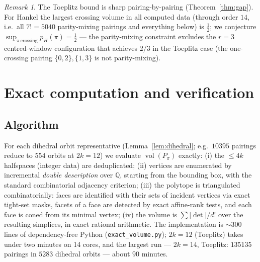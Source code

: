 ﻿\documentclass[11pt]{article}
\theoremstyle{remark}
\newtheorem{remark}[theorem]{Remark}
\newcommand{\vol}{\operatorname{vol}}
\begin{document}
\begin{remark}\label{rem:hankel-half}
The Toeplitz bound is sharp pairing-by-pairing (Theorem~\ref{thm:gap}). For Hankel the
largest crossing volume in all computed data (through order $14$, i.e.\ all
$7!=5040$ parity-mixing pairings and everything below) is $\tfrac12$; we conjecture
$\sup_{\pi\ \mathrm{crossing}}p_H(\pi)=\tfrac12$ --- the parity-mixing constraint
excludes the $r=3$ centred-window configuration that achieves $2/3$ in the Toeplitz
case (the one-crossing pairing $\{0,2\},\{1,3\}$ is not parity-mixing).
\end{remark}

\section{Exact computation and verification}\label{sec:computation}

\subsection{Algorithm}
For each dihedral orbit representative (Lemma~\ref{lem:dihedral}; e.g.\ $10395$
pairings reduce to $554$ orbits at $2k=12$) we evaluate $\vol(P_\pi)$ exactly:
(i) the $\le4k$ halfspaces (integer data) are deduplicated;
(ii) vertices are enumerated by incremental \emph{double description} over
$\mathbb{Q}$, starting from the bounding box, with the standard combinatorial
adjacency criterion;
(iii) the polytope is triangulated combinatorially: faces are identified with their
sets of incident vertices via exact tight-set masks, facets of a face are detected by
exact affine-rank tests, and each face is coned from its minimal vertex;
(iv) the volume is $\sum|\det|/d!$ over the resulting simplices, in exact rational
arithmetic. The implementation is $\sim$300 lines of dependency-free Python
(\texttt{exact\_volume.py}); $2k=12$ (Toeplitz) takes under two minutes on 14 cores,
and the largest run --- $2k=14$, Toeplitz: $135135$ pairings in $5283$ dihedral
orbits --- about $90$ minutes.
\end{document}
